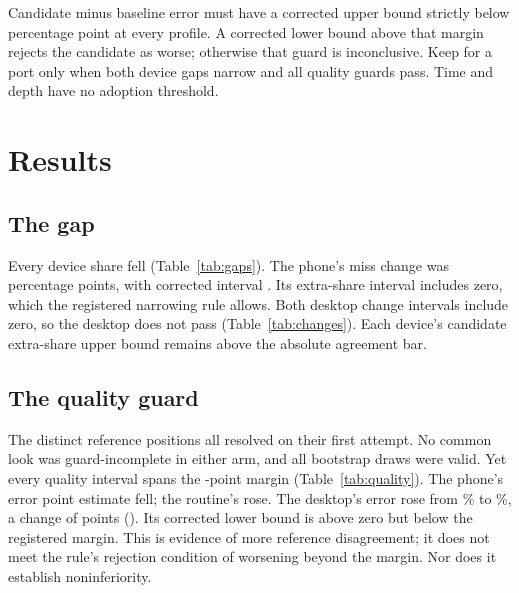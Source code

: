 \documentclass[11pt]{article}
\begin{document}
Candidate minus baseline error must have a corrected upper bound strictly
below \QualityMargin{} percentage point at every profile. A corrected lower
bound above that margin rejects the candidate as worse; otherwise that guard
is inconclusive. Keep for a port only when both device gaps narrow and all
quality guards pass. Time and depth have no adoption threshold.

\section{Results}
\subsection{The gap}
Every device share fell (Table~\ref{tab:gaps}). The phone's miss change was
\PhoneMissChange{} percentage points, with corrected interval
\PhoneMissChangeInterval. Its extra-share interval includes zero, which the
registered narrowing rule allows. Both desktop change intervals include
zero, so the desktop does not pass (Table~\ref{tab:changes}). Each device's
candidate extra-share upper bound remains above the absolute agreement bar.

\begin{table}[ht]
\centering\GapTable
\caption{Final serious-error sets. Shares have ordinary \Confidence\%
intervals. Each arm uses its own routine as comparator.}
\label{tab:gaps}
\end{table}

\begin{table}[ht]
\centering\GapChangeTable
\caption{Paired changes and the registered narrowing decision.}
\label{tab:changes}
\end{table}

\subsection{The quality guard}
The \ReferencePositions{} distinct reference positions all resolved on their
first attempt. No common look was guard-incomplete in either arm, and all
\Draws{} bootstrap draws were valid. Yet every quality interval spans the
\QualityMargin-point margin (Table~\ref{tab:quality}). The phone's error
point estimate fell; the routine's rose. The desktop's error rose from
\DesktopBaselineError\% to \DesktopCandidateError\%, a change of
\DesktopErrorChange{} points (\DesktopErrorInterval). Its corrected lower
bound is above zero but below the registered margin. This is evidence of
more reference disagreement; it does not meet the rule's rejection condition
of worsening beyond the margin. Nor does it establish noninferiority.
\end{document}
